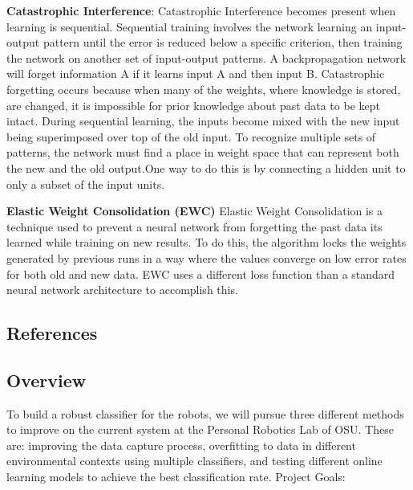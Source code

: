 \documentclass[draftclsnofoot, onecolumn, 10pt, compsoc]{IEEEtran}
\begin{document}
		\noindent\textbf{Catastrophic Interference}: Catastrophic Interference becomes present when learning is sequential. Sequential training involves the network learning an input-output pattern until the error is reduced below a specific criterion, then training the network on another set of input-output patterns. A backpropagation network will forget information A if it learns input A and then input B. Catastrophic forgetting occurs because when many of the weights, where knowledge is stored, are changed, it is impossible for prior knowledge about past data to be kept intact. During sequential learning, the inputs become mixed with the new input being superimposed over top of the old input. To recognize multiple sets of patterns, the network must find a place in weight space that can represent both the new and the old output.One way to do this is by connecting a hidden unit to only a subset of the input units. \cite{ImgRecog}
		\cite{miller}
		
		\noindent\textbf{Elastic Weight Consolidation (EWC)}
		Elastic Weight Consolidation is a technique used to prevent a neural network from forgetting the past data its learned while training on new results. To do this, the algorithm locks the weights generated by previous runs in a way where the values converge on low error rates for both old and new data. EWC uses a different loss function than a standard neural network architecture to accomplish this.

	\subsection{References}
		
		

	\subsection{Overview}
		To build a robust classifier for the robots, we will pursue three different methods to improve on the current system at the Personal Robotics Lab of OSU. These are: improving the data capture process, overfitting to data in different environmental contexts using multiple classifiers, and testing different online learning models to achieve the best classification rate. Project Goals:
		
\end{document}
